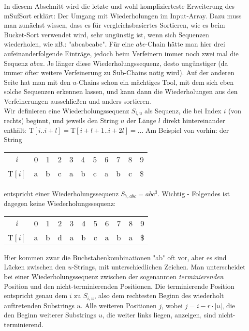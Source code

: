 In diesem Abschnitt wird die letzte und wohl komplizierteste Erweiterung des mSufSort erklärt: Der Umgang mit Wiederholungen im Input-Array. Dazu muss man zunächst wissen, dass es für vergleichsbasiertes Sortieren, wie es beim Bucket-Sort verwendet wird, sehr ungünstig ist, wenn sich Sequenzen wiederholen, wie zB.: "abcabcabc". Für eine $abc$-Chain hätte man hier drei aufeinanderfolgende Einträge, jedoch beim Verfeinern immer noch zwei mal die Sequenz $abca$. Je länger diese Wiederholungssequenz, desto ungünstiger (da immer öfter weitere Verfeinerung zu Sub-Chains nötig wird).
Auf der anderen Seite hat man mit den $u$-Chains schon ein mächtiges Tool, mit dem sich eben solche Sequenzen erkennen lassen, und kann dann die Wiederholungen aus den Verfeinerungen ausschließen und anders sortieren.\\
Wir definieren eine Wiederholungssequenz $S_{i,u}$ als Sequenz, die bei Index $i$ (von rechts) beginnt, und jeweils den String $u$ der Länge $l$ direkt hintereinander enthält:
T$[i..i+l]=$T$[i+l+1..i+2l]=...$
Am Beispiel von vorhin: der String 
\begin{center}
\begin{tabular}{c c c c c c c c c c c}
$i$ & 0 & 1 & 2 & 3 & 4 & 5 & 6 & 7 & 8 & 9\\
T$[i]$ & a & b & c & a & b & c & a & b & c & \$\\
\end{tabular}
\end{center}
entspricht einer Wiederholungssequenz $S_{7,abc} = abc^3$.
Wichtig - Folgendes ist dagegen keine Wiederholungssequenz:
\begin{center}
\begin{tabular}{c c c c c c c c c c c}
$i$ & 0 & 1 & 2 & 3 & 4 & 5 & 6 & 7 & 8 & 9\\
T$[i]$ & a & b & d & a & b & c & a & b & a & \$\\
\end{tabular}
\end{center}
Hier kommen zwar die Buchstabenkombinationen "ab" oft vor, aber es sind Lücken zwischen den $u$-Strings, mit unterschiedlichen Zeichen.
Man unterscheidet bei einer Wiederholungssequenz zwischen der sogenannten \textit{terminierenden} Position und den {nicht-terminierenden} Positionen. Die terminierende Position entspricht genau dem $i$ zu $S_{i,u}$, also dem rechtesten Beginn des wiederholt auftretenden Substrings $u$. Alle weiteren Positionen $j$, wobei $j = i-r\cdot |u|$, die den Beginn weiterer Substrings $u$, die weiter links liegen, anzeigen, sind nicht-terminierend.\\
